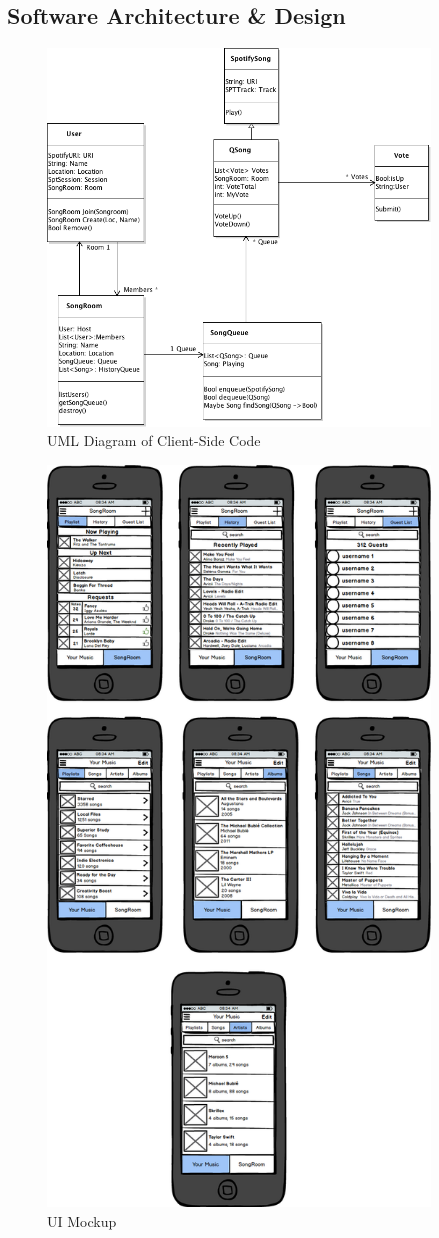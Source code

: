 \documentclass[12pt]{article}
\begin{document}
\subsection{Software Architecture \& Design}
\begin{figure}[h]
  \centering
  \includegraphics[width=4in]{ClassDiagram}
  \caption {UML Diagram of Client-Side Code}
\end{figure}

\begin{figure}[htb!]
  \centering
  \includegraphics[width=4in]{mockup.png}
  \caption {UI Mockup}
\end{figure}
\end{document}
